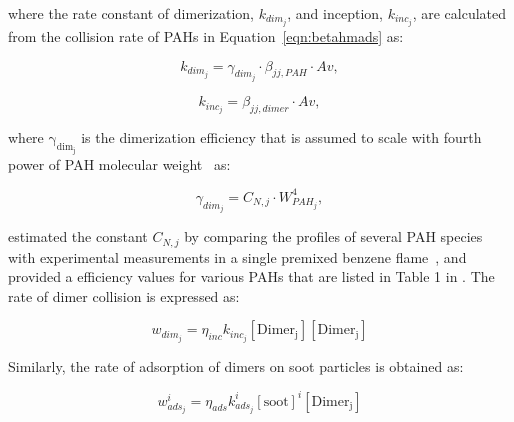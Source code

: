 
\noindent where the rate constant of dimerization, ${k_{dim_{j}}}$, and inception, ${k_{inc_{j}}}$, are calculated from the collision rate of PAHs in Equation~\eqref{eqn:betahmads} as:

\begin{equation}
	k_{dim_{j}}=
	\gamma_{dim_j}\cdot\beta_{jj,PAH}\cdot Av
	\label{eqn:kdim_dimcoal},
\end{equation}

\begin{equation}
	k_{inc_{j}}=
	\beta_{jj,dimer}\cdot Av
	\label{eqn:kinc_dimcoal},
\end{equation}

 \noindent where $\mathrm{\gamma_{dim_j}}$ is the dimerization efficiency that is assumed to scale with fourth power of PAH molecular weight~\cite{blanquart2009analyzing} as:

\begin{equation}
	\gamma_{dim_j}=
	C_{N,j}\cdot W_{PAH_j}^4
	\label{eqn:gamma_dimcoal},
\end{equation} 

\citet{blanquart2009joint} estimated the constant ${C_{N,j}}$ by comparing the profiles of several PAH species with experimental measurements in a single premixed benzene flame~\citep{tregrossi1999combustion}, and provided a efficiency values for various PAHs that are listed in Table 1 in \citep{blanquart2009analyzing}. The rate of dimer collision is expressed as:

\begin{equation}
	w_{dim_j} = \eta_{inc} k_{inc_{j}} [\mathrm{Dimer_j}] [\mathrm{Dimer_j}]
	\label{eqn:wdim_dimcoal}
\end{equation}

Similarly, the rate of adsorption of dimers on soot particles is obtained as:

\begin{equation}
	w^i_{ads_j} = \eta_{ads} k^i_{ads_{j}} [\mathrm{soot}]^i [\mathrm{Dimer_j}]
\end{equation}

